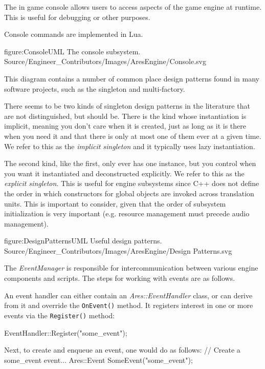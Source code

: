 \page
{}
The in game console allows users to access aspects of the game engine at runtime. This is useful for debugging or other purposes.

Console commands are implemented in Lua.

\FullPageDiagram
    {figure:ConsoleUML}
    {The console subsystem.}
    {Source/Engineer_Contributors/Images/AresEngine/Console.svg}

\page
{}
This diagram contains a number of common place design patterns found in many software projects, such as the singleton and multi-factory. 

There seems to be two kinds of singleton design patterns in the literature that are not distinguished, but should be. There is the kind whose instantiation is implicit, meaning you don't care when it is created, just as long as it is there when you need it and that there is only at most one of them ever at a given time. We refer to this as the {\it implicit singleton} and it typically uses lazy instantiation.

The second kind, like the first, only ever has one instance, but you control when you want it instantiated and deconstructed explicitly. We refer to this as the {\it explicit singleton}. This is useful for engine subsystems since C++ does not define the order in which constructors for global objects are invoked across translation units. This is important to consider, given that the order of subsystem initialization is very important (e.g. resource management must precede audio management).

\FullPageDiagram
    {figure:DesignPatternsUML}
    {Useful design patterns.}
    {Source/Engineer_Contributors/Images/AresEngine/Design Patterns.svg}

\page 
{}
The {\it EventManager} is responsible for intercommunication between various engine components and scripts. The steps for working with events are as follows.

An event handler can either contain an {\it Ares::EventHandler} class, or can derive from it and override the {\tt OnEvent()} method. It registers interest in one or more events via the {\tt Register()} method:

\startCodeExample
EventHandler::Register("some_event");
\stopCodeExample

Next, to create and enqueue an event, one would do as follows:
\startCodeExample
// Create a some_event event...
Ares::Event SomeEvent("some_event");

